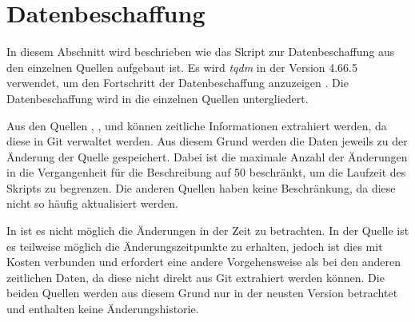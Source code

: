 \section{Datenbeschaffung}
\label{sec:datenbeschaffung}
In diesem Abschnitt wird beschrieben wie das Skript zur Datenbeschaffung aus den einzelnen Quellen aufgebaut ist.
Es wird \emph{tqdm} in der Version 4.66.5 verwendet, um den Fortschritt der Datenbeschaffung anzuzeigen \autocite{costa-luis_tqdm_2024}.
Die Datenbeschaffung wird in die einzelnen Quellen untergliedert.

Aus den Quellen , ,  und  können zeitliche Informationen extrahiert werden, da diese in Git verwaltet werden.
Aus diesem Grund werden die Daten jeweils zu der Änderung der Quelle gespeichert.
Dabei ist die maximale Anzahl der Änderungen in die Vergangenheit für die Beschreibung auf 50 beschränkt, um die Laufzeit des Skripts zu begrenzen.
Die anderen Quellen haben keine Beschränkung, da diese nicht so häufig aktualisiert werden.

In  ist es nicht möglich die Änderungen in der Zeit zu betrachten.
In der  Quelle ist es teilweise möglich die Änderungszeitpunkte zu erhalten, jedoch ist dies mit Kosten verbunden und erfordert eine andere Vorgehensweise als bei den anderen zeitlichen Daten, da diese nicht direkt aus Git extrahiert werden können.
Die beiden Quellen werden aus diesem Grund nur in der neusten Version betrachtet und enthalten keine Änderungshistorie.

